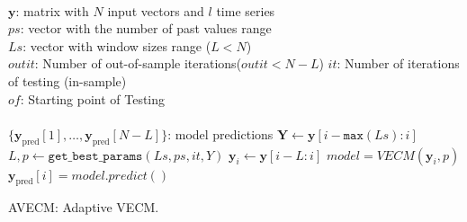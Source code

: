 \begin{algorithm}[ht]
\begin{algorithmic}[1]
\REQUIRE $\,$ \\
$\mathbf{y}$: matrix with $N$ input vectors and $l$ time series\\
$ps$: vector with the number of past values range \\
$Ls$: vector with window sizes range ($L<N$) \\
$outit$: Number of out-of-sample iterations($outit < N-L$)
$it$: Number of iterations of testing (in-sample)\\
$of$: Starting point of Testing \\
\ENSURE  $\,$ \\
$\{ \mathbf{y}_{\text{pred}}[1],\dots,\mathbf{y}_{\text{pred}}[N-L]\}$: model predictions 
   \STATE $\mathbf{Y} \gets \mathbf{y}[i-\texttt{max}(Ls):i]$
    \STATE $L,p \gets
    \texttt{get\_best\_params}(Ls,ps,it,Y)$
    \STATE $\mathbf{y}_i \gets \mathbf{y}[i-L:i]$
        \STATE $model = VECM(\mathbf{y}_i, p)$
        \STATE $\mathbf{y}_{\text{pred}}[i] = model.predict()$
\ENDFOR
\end{algorithmic}
\caption{AVECM: Adaptive VECM.}
\label{alg:AVECM}
\end{algorithm}
%
%
%
%
%
%
